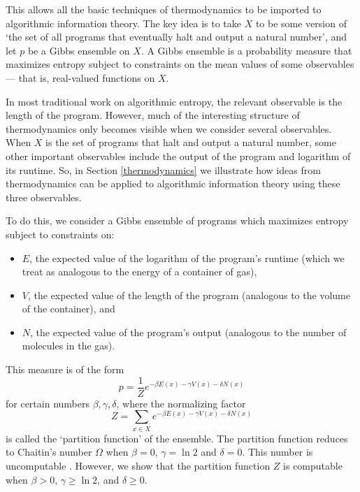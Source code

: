 \documentclass[12pt,twoside,openright]{report}
\begin{document}
This allows all the basic techniques of thermodynamics to be imported to algorithmic information theory.  The key idea is to take $X$ to be some version of `the set of all programs that eventually halt and output a natural number', and let $p$ be a Gibbs ensemble on $X$.  A
Gibbs ensemble is a probability measure that maximizes entropy subject to constraints on the mean values of some observables --- that is, real-valued functions on $X$.

In most traditional work on algorithmic entropy, the relevant observable is the length of the program.  However, much of the interesting structure of thermodynamics only becomes visible when we consider several observables.  When $X$ is the set of programs that halt and output a natural number, some other important observables include the output of the program and logarithm of its runtime.  So, in Section \ref{thermodynamics} we illustrate how ideas from thermodynamics can be applied to algorithmic information theory using these three observables.  

To do this, we consider a Gibbs ensemble of programs which maximizes entropy subject to constraints on:
\begin{itemize}
\item
$E$, the expected value of the logarithm of the program's runtime (which we treat as analogous to the energy of a container of gas),
\item 
$V$, the expected value of the length of the program (analogous to the volume of the container), and 
\item
$N$, the expected value of the program's output (analogous to the number of molecules in the gas).
\end{itemize}
This measure is of the form
\[       p = \frac{1}{Z} e^{-\beta E(x) -\gamma V(x) - \delta N(x)} \]
for certain numbers $\beta, \gamma, \delta$, where the normalizing factor
\[     Z = \sum_{x \in X} e^{-\beta E(x) -\gamma V(x) - \delta N(x)} \]
is called the `partition function' of the ensemble.  The partition function reduces to Chaitin's number $\Omega$ when $\beta = 0$, $\gamma = \ln 2$ and $\delta = 0$.  This number is uncomputable \cite{Chaitin1975}.  However, we show that the partition function $Z$ is computable when $\beta > 0$, $\gamma \ge \ln 2$, and $\delta \ge 0$.
\end{document}
